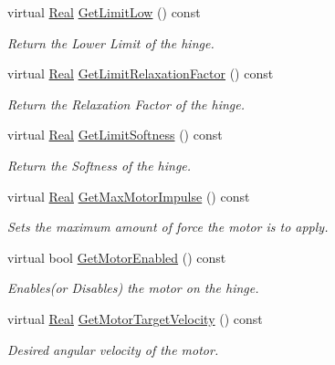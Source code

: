 \begin{DoxyCompactItemize}
virtual \hyperlink{namespacephys_af7eb897198d265b8e868f45240230d5f}{Real} \hyperlink{classphys_1_1HingeConstraint_a2e467d00131cbfd61070c10749403546}{GetLimitLow} () const 
\begin{DoxyCompactList}\small\item\em Return the Lower Limit of the hinge. \item\end{DoxyCompactList}\item 
virtual \hyperlink{namespacephys_af7eb897198d265b8e868f45240230d5f}{Real} \hyperlink{classphys_1_1HingeConstraint_a65bfeef0326cd74fd3209940f5a14bbc}{GetLimitRelaxationFactor} () const 
\begin{DoxyCompactList}\small\item\em Return the Relaxation Factor of the hinge. \item\end{DoxyCompactList}\item 
virtual \hyperlink{namespacephys_af7eb897198d265b8e868f45240230d5f}{Real} \hyperlink{classphys_1_1HingeConstraint_a9c87c6f21dd7959cfb5c3c7a63014171}{GetLimitSoftness} () const 
\begin{DoxyCompactList}\small\item\em Return the Softness of the hinge. \item\end{DoxyCompactList}\item 
virtual \hyperlink{namespacephys_af7eb897198d265b8e868f45240230d5f}{Real} \hyperlink{classphys_1_1HingeConstraint_a954621d35173f9de5d7f44760559040e}{GetMaxMotorImpulse} () const 
\begin{DoxyCompactList}\small\item\em Sets the maximum amount of force the motor is to apply. \item\end{DoxyCompactList}\item 
virtual bool \hyperlink{classphys_1_1HingeConstraint_abc2a2e5046276f3cdab285d87f969c8a}{GetMotorEnabled} () const 
\begin{DoxyCompactList}\small\item\em Enables(or Disables) the motor on the hinge. \item\end{DoxyCompactList}\item 
virtual \hyperlink{namespacephys_af7eb897198d265b8e868f45240230d5f}{Real} \hyperlink{classphys_1_1HingeConstraint_aeb1844f6bffeb72995e95b9ea25be3b7}{GetMotorTargetVelocity} () const 
\begin{DoxyCompactList}\small\item\em Desired angular velocity of the motor. \item\end{DoxyCompactList}\item 

\end{DoxyCompactItemize}

